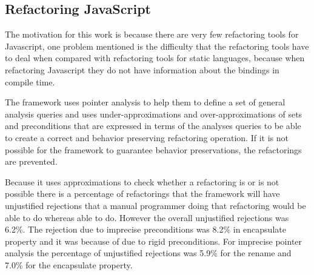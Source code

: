 \subsection{Refactoring JavaScript}

The motivation for this work is because there are very few refactoring tools for Javascript, one problem mentioned is the difficulty that the refactoring tools have to deal when compared with refactoring tools for static languages, because when refactoring Javascript they do not have information about the bindings in compile time.


The framework uses pointer analysis to help them to define a set of general analysis queries and uses under-approximations and over-approximations of sets and preconditions that are expressed in terms of the analyses queries to be able to create a correct and behavior preserving refactoring operation. If it is not possible for the framework to guarantee behavior preservations, the refactorings are prevented.


Because it uses approximations to check whether a refactoring is or is not possible there is a percentage of refactorings that the framework will have unjustified rejections that a manual programmer doing that refactoring would be able to do whereas able to do. However the overall unjustified rejections was 6.2\%. The rejection due to imprecise preconditions was 8.2\% in encapsulate property and it was because of due to rigid preconditions. For imprecise pointer analysis the percentage of unjustified rejections was 5.9\% for the rename and 7.0\% for the encapsulate property.
